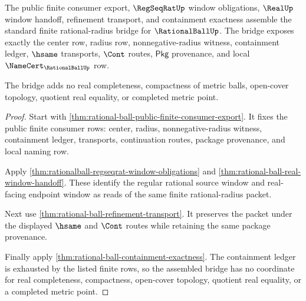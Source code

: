 \begin{theorem}
\label{thm:rationalball-standard-finite-window-bridge}
The public finite consumer export, $\RegSeqRatUp$ window obligations,
$\RealUp$ window handoff, refinement transport, and containment exactness
assemble the standard finite rational-radius bridge for $\RationalBallUp$.
The bridge exposes exactly the center row, radius row, nonnegative-radius
witness, containment ledger, $\hsame$ transports, $\Cont$ routes, $\mathsf{Pkg}$
provenance, and local $\NameCert_{\RationalBallUp}$ row.

The bridge adds no real completeness, compactness of metric balls, open-cover
topology, quotient real equality, or completed metric point.
\end{theorem}
\begin{proof}
Start with \autoref{thm:rational-ball-public-finite-consumer-export}. It fixes
the public finite consumer rows: center, radius, nonnegative-radius witness,
containment ledger, transports, continuation routes, package provenance, and
local naming row.

Apply \autoref{thm:rationalball-regseqrat-window-obligations} and
\autoref{thm:rational-ball-real-window-handoff}. These identify the regular
rational source window and real-facing endpoint window as reads of the same
finite rational-radius packet.

Next use \autoref{thm:rational-ball-refinement-transport}. It preserves the
packet under the displayed $\hsame$ and $\Cont$ routes while retaining the same
package provenance.

Finally apply \autoref{thm:rational-ball-containment-exactness}. The
containment ledger is exhausted by the listed finite rows, so the assembled
bridge has no coordinate for real completeness, compactness, open-cover
topology, quotient real equality, or a completed metric point.
\end{proof}

